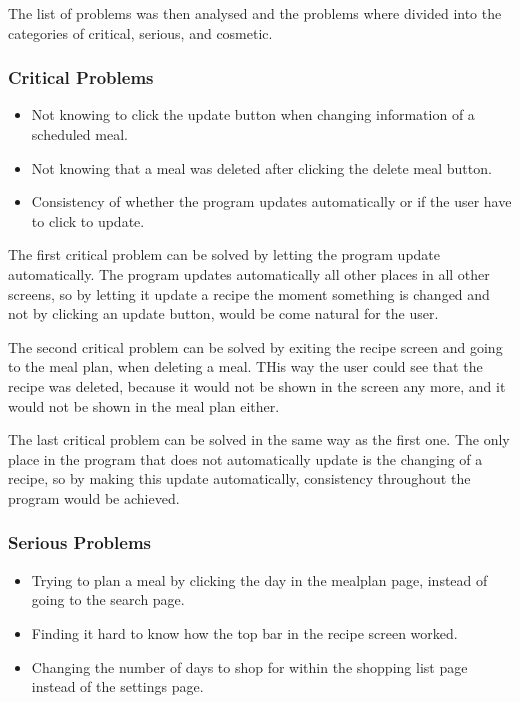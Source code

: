 The list of problems was then analysed and the problems where divided into the categories of critical, serious, and cosmetic.

\subsubsection{Critical Problems}

\begin{itemize}
    \item Not knowing to click the update button when changing information of a scheduled meal.
    \item Not knowing that a meal was deleted after clicking the delete meal button.
    \item Consistency of whether the program updates automatically or if the user have to click to update.
\end{itemize}    
The first critical problem can be solved by letting the program update automatically. The program updates automatically all other places in all other screens, so by letting it update a recipe the moment something is changed and not by clicking an update button, would be come natural for the user.

The second critical problem can be solved by exiting the recipe screen and going to the meal plan, when deleting a meal. THis way the user could see that the recipe was deleted, because it would not be shown in the screen any more, and it would not be shown in the meal plan either.

The last critical problem can be solved in the same way as the first one. The only place in the program that does not automatically update is the changing of a recipe, so by making this update automatically, consistency throughout the program would be achieved.

\subsubsection{Serious Problems}

\begin{itemize}
    \item Trying to plan a meal by clicking the day in the mealplan page, instead of going to the search page.
    \item Finding it hard to know how the top bar in the recipe screen worked.
    \item Changing the number of days to shop for within the shopping list page instead of the settings page.
\end{itemize}

